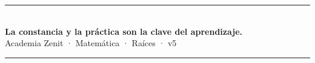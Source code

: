 \documentclass[11pt, letterpaper]{article}
\begin{document}
\vspace{8pt}
\begin{center}
  \rule{\linewidth}{1.5pt}\\[4pt]
  {\large\bfseries\color{zenitnavy} La constancia y la práctica son la clave del aprendizaje.}\\[2pt]
  {\color{zenitgold}\small Academia Zenit · Matemática · Raíces · v5}
  \rule{\linewidth}{1.5pt}
\end{center}
\end{document}
